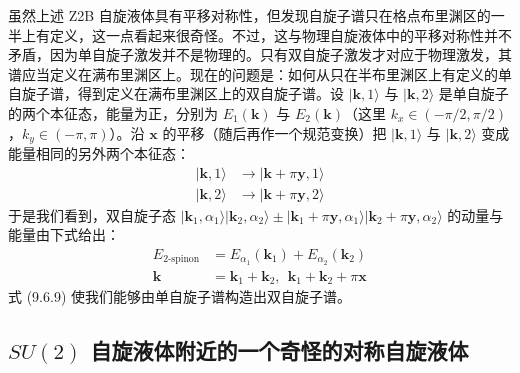 虽然上述 Z2B 自旋液体具有平移对称性，但发现自旋子谱只在格点布里渊区的一半上有定义，这一点看起来很奇怪。不过，这与物理自旋液体中的平移对称性并不矛盾，因为单自旋子激发并不是物理的。只有双自旋子激发才对应于物理激发，其谱应当定义在满布里渊区上。现在的问题是：如何从只在半布里渊区上有定义的单自旋子谱，得到定义在满布里渊区上的双自旋子谱。设 $|\pmb{k},1\rangle$ 与 $|\pmb{k},2\rangle$ 是单自旋子的两个本征态，能量为正，分别为 $E_1(\pmb{k})$ 与 $E_2(\pmb{k})$（这里 $k_x\in(-\pi/2,\pi/2)$，$k_y\in(-\pi,\pi)$）。沿 $\pmb{x}$ 的平移（随后再作一个规范变换）把 $|\pmb{k},1\rangle$ 与 $|\pmb{k},2\rangle$ 变成能量相同的另外两个本征态：
\begin{equation*}
\begin{aligned}
|\pmb{k},1\rangle &\to |\pmb{k}+\pi\pmb{y},1\rangle \\
|\pmb{k},2\rangle &\to |\pmb{k}+\pi\pmb{y},2\rangle
\end{aligned}
\end{equation*}
于是我们看到，双自旋子态 $|\pmb{k}_1,\alpha_1\rangle|\pmb{k}_2,\alpha_2\rangle\pm|\pmb{k}_1+\pi\pmb{y},\alpha_1\rangle|\pmb{k}_2+\pi\pmb{y},\alpha_2\rangle$ 的动量与能量由下式给出：
\begin{equation*}
\begin{aligned}
E_{2\text{-spinon}} &= E_{\alpha_1}(\pmb{k}_1)+E_{\alpha_2}(\pmb{k}_2) \\
\pmb{k} &= \pmb{k}_1+\pmb{k}_2,\ \ \pmb{k}_1+\pmb{k}_2+\pi\pmb{x}
\end{aligned}
\tag{9.6.9}
\end{equation*}
式 (9.6.9) 使我们能够由单自旋子谱构造出双自旋子谱。

\subsection{$SU(2)$ 自旋液体附近的一个奇怪的对称自旋液体}

